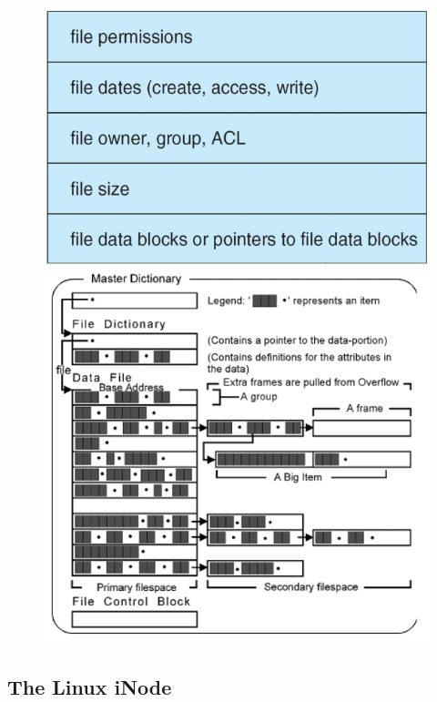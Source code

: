\begin{figure}[h!]
    \begin{minipage}[h!]{0.5\textwidth}
        \centering
        \includegraphics[width=1\linewidth]{img/mfhg.png}
    \end{minipage}
    \begin{minipage}[h!]{0.5\textwidth}
    \centering
    \includegraphics[width=1\linewidth]{img/dfngb.png}     
    \end{minipage}
\end{figure}

\subsection{The Linux iNode}

